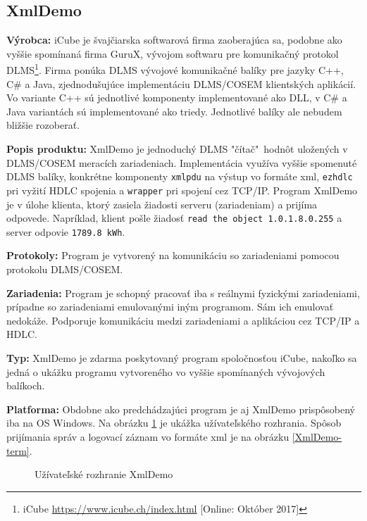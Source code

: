 \subsection{XmlDemo}
\textbf{Výrobca:} iCube je švajčiarska softwarová firma zaoberajúca sa, podobne ako vyššie spomínaná firma GuruX, vývojom softwaru pre komunikačný protokol DLMS\footnote{iCube \url{https://www.icube.ch/index.html} [Online: Október 2017]}. Firma ponúka DLMS vývojové komunikačné balíky pre jazyky C++, C\# a Java, zjednodušujúce implementáciu DLMS/COSEM klientských aplikácií. Vo variante C++ sú jednotlivé komponenty implementované ako DLL, v C\# a Java variantách sú implementované ako triedy. Jednotlivé balíky ale nebudem bližšie rozoberať. \par
\noindent \textbf{Popis produktu:} XmlDemo je jednoduchý DLMS "čítač"\ hodnôt uložených v DLMS/COSEM meracích zariadeniach. Implementácia využíva vyššie spomenuté DLMS balíky, konkrétne komponenty {\tt xmlpdu} na výstup vo formáte xml, {\tt ezhdlc} pri vyžití HDLC spojenia a {\tt wrapper} pri spojení cez TCP/IP. Program XmlDemo je v úlohe klienta, ktorý zasiela žiadosti serveru (zariadeniam) a prijíma odpovede. Napríklad, klient pošle žiadosť {\tt read the object 1.0.1.8.0.255} a server odpovie {\tt 1789.8 kWh}. \par
\noindent \textbf{Protokoly:} Program je vytvorený na komunikáciu so zariadeniami pomocou protokolu DLMS/COSEM. \par
\noindent \textbf{Zariadenia:} Program je schopný pracovať iba s reálnymi fyzickými zariadeniami, prípadne so zariadeniami emulovanými iným programom. Sám ich emulovať nedokáže. Podporuje komunikáciu medzi zariadeniami a aplikáciou cez TCP/IP a HDLC. \par
\noindent \textbf{Typ:} XmlDemo je zdarma poskytovaný program spoločnosťou iCube, nakoľko sa jedná o ukážku programu vytvoreného vo vyššie spomínaných vývojových balíkoch. \par
\noindent \textbf{Platforma:} Obdobne ako predchádzajúci program je aj XmlDemo prispôsobený iba na OS Windows. Na obrázku \ref{XmlDemo} je ukážka užívateľského rozhrania. Spôsob prijímania správ a logovací záznam vo formáte xml je na obrázku \ref{XmlDemo-term}. \par
\begin{figure}[h]
	\centering
    \caption{Užívateľské rozhranie XmlDemo}
\label{XmlDemo}
\end{figure} \par

